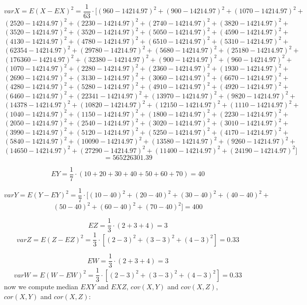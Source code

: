 \documentclass[11pt,twoside,a4paper]{book}
\begin{document}
$$varX=E(X-EX)^2=\frac{1}{63}\cdot[\left(960-14214.97
\right)^2+\left(900-14214.97\right)^2+\left(1070 -14214.97\right)^2+$$
$$\left(2520-14214.97\right)^2+\left(2230-14214.97\right)^2+\left(2740-14214.97\right)^2+\left(3820-14214.97\right)^2+$$
$$\left(3520-14214.97\right)^2+\left(3520-14214.97\right)^2+\left(5050-14214.97\right)^2+\left(4590-14214.97\right)^2+$$
$$\left( 4130
-14214.97\right)^2+\left(4780-14214.97\right)^2+\left(6510-14214.97\right)^2+\left(5310-14214.97\right)^2+$$
$$\left(62354-14214.97\right)^2+\left(29780-14214.97\right)^2+\left(5680-14214.97\right)^2+\left(25180-14214.97\right)^2+$$
$$\left(176360-14214.97\right)^2+\left(32380-14214.97\right)^2+\left(900-14214.97
\right)^2+\left(960-14214.97\right)^2+$$
$$\left(1070
-14214.97\right)^2+\left(2280-14214.97\right)^2+\left(2360-14214.97\right)^2+\left(1930-14214.97\right)^2+$$ $$\left(2690-14214.97\right)^2+\left(3130-14214.97\right)^2+\left(3060-14214.97\right)^2+\left(6670-14214.97\right)^2+$$
$$\left(4280-14214.97\right)^2+\left( 5280
-14214.97\right)^2+\left(4910-14214.97\right)^2+\left(4920-14214.97\right)^2+$$
$$\left(6460-14214.97\right)^2+\left(22341-14214.97\right)^2+\left(13970-14214.97\right)^2+\left(9820-14214.97\right)^2+$$
$$\left(14378-14214.97\right)^2+\left(10820-14214.97\right)^2+\left(12150-14214.97\right)^2+\left(1110-14214.97
\right)^2+$$
$$\left(1040-14214.97\right)^2+\left(1150
-14214.97\right)^2+\left(1800-14214.97\right)^2+\left(2230-14214.97\right)^2+$$
$$\left(2050-14214.97\right)^2+\left(2540-14214.97\right)^2+\left(3020-14214.97\right)^2+\left(3010-14214.97\right)^2+$$
$$\left(3990-14214.97\right)^2+\left(5120-14214.97\right)^2+\left( 5250
-14214.97\right)^2+\left(4170-14214.97\right)^2+$$
$$\left(5840-14214.97\right)^2+\left(10090-14214.97\right)^2+\left(13580-14214.97\right)^2+\left(9260-14214.97\right)^2+$$
$$\left(14650-14214.97\right)^2+\left(27290-14214.97\right)^2+\left(11400-14214.97\right)^2+\left(24190-14214.97\right)^2]$$
$$=565226301.39$$


$$EY = \frac{1}{7}\cdot \left(10 + 20+ 30 + 40 +  50 +  60 +
 70\right)=40$$

$$varY=E(Y-EY)^2=\frac{1}{7}\cdot[\left(10 -40\right)^2+\left(20
-40\right)^2+\left(30 -40\right)^2+\left(40 -40\right)^2+$$
$$\left(50 -40\right)^2+\left(60 -40\right)^2+\left(70 -40\right)^2]=400$$

$$EZ = \frac{1}{3}\cdot \left(2 +  3 + 4\right)=3$$
$$varZ=E(Z-EZ)^2=\frac{1}{3}\cdot [\left(2 -  3\right)^2+\left(3 - 
3\right)^2+\left(4 -  3\right)^2]=0.33$$

$$EW = \frac{1}{3}\cdot \left(2 +  3 + 4\right)=3$$
$$varW=E(W-EW)^2=\frac{1}{3}\cdot [\left(2 -  3\right)^2+\left(3 - 
3\right)^2+\left(4 -  3\right)^2]=0.33$$  
now we compute median $EXY$ and $EXZ$, $cov(X,Y)$ and $cov(X,Z)$, $cor(X,Y)$
and $cor(X,Z)$:
\end{document}
